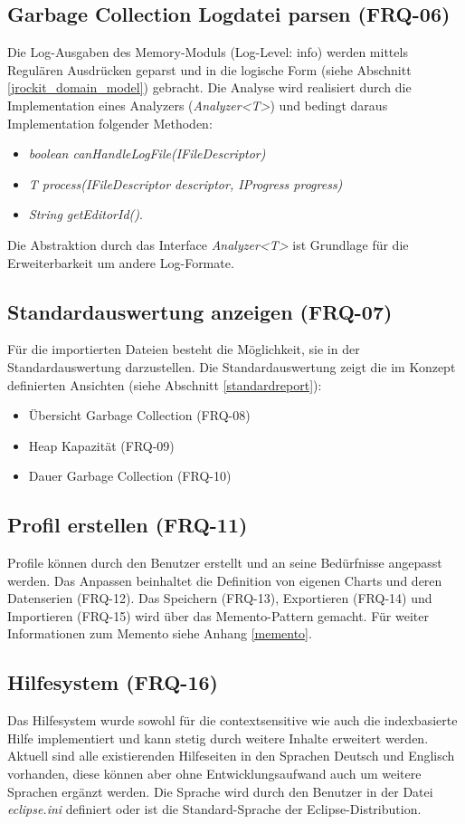 \subsection{Garbage Collection Logdatei parsen (FRQ-06)}
Die Log-Ausgaben des Memory-Moduls (Log-Level: info) werden mittels Regulären Ausdrücken geparst und in die logische Form (siehe Abschnitt \ref{jrockit_domain_model}) gebracht. Die Analyse wird realisiert durch die Implementation eines Analyzers (\textit{Analyzer\textless T\textgreater}) und bedingt daraus Implementation folgender Methoden:
\begin{itemize}
\item \textit{boolean canHandleLogFile(IFileDescriptor)}
\item \textit{T process(IFileDescriptor descriptor, IProgress progress)}
\item \textit{String getEditorId()}.
\end{itemize}
Die Abstraktion durch das Interface \textit{Analyzer\textless T\textgreater} ist Grundlage für die Erweiterbarkeit um andere Log-Formate.

\subsection{Standardauswertung anzeigen (FRQ-07)}
Für die importierten Dateien besteht die Möglichkeit, sie in der Standardauswertung darzustellen. Die Standardauswertung zeigt die im Konzept definierten Ansichten (siehe Abschnitt \ref{standardreport}):
\begin{itemize}
\item Übersicht Garbage Collection (FRQ-08)
\item Heap Kapazität (FRQ-09)
\item Dauer Garbage Collection (FRQ-10)
\end{itemize}

\subsection{Profil erstellen (FRQ-11)}
Profile können durch den Benutzer erstellt und an seine Bedürfnisse angepasst werden. Das Anpassen beinhaltet die Definition von eigenen Charts und deren Datenserien (FRQ-12). Das Speichern (FRQ-13), Exportieren (FRQ-14) und Importieren (FRQ-15) wird über das Memento-Pattern gemacht. Für weiter Informationen zum Memento siehe Anhang \ref{memento}.

\subsection{Hilfesystem (FRQ-16)}
Das Hilfesystem wurde sowohl für die contextsensitive wie auch die indexbasierte Hilfe implementiert und kann stetig durch weitere Inhalte erweitert werden. Aktuell sind alle existierenden Hilfeseiten in den Sprachen Deutsch und Englisch vorhanden, diese können aber ohne Entwicklungsaufwand auch um weitere Sprachen ergänzt werden. Die Sprache wird durch den Benutzer in der Datei \textit{eclipse.ini} definiert oder ist die Standard-Sprache der Eclipse-Distribution.

